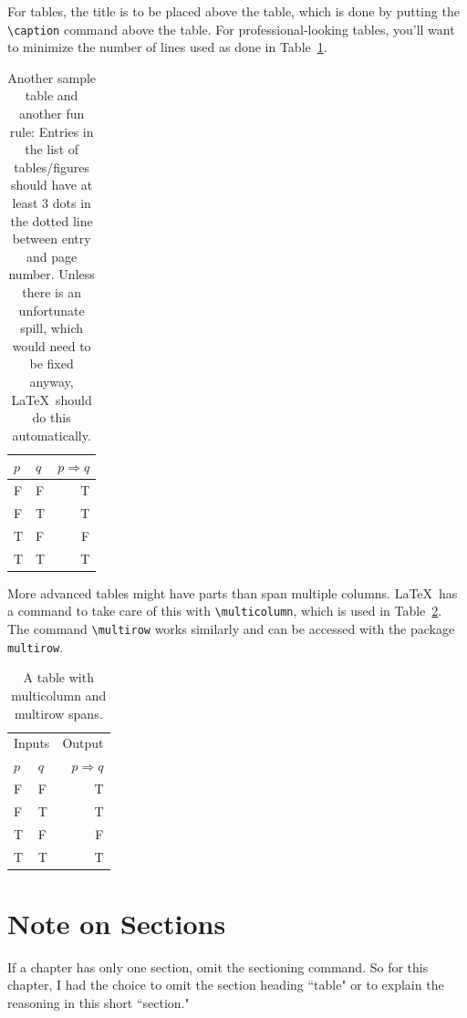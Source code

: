 For tables, the title is to be placed above the table,
which is done by putting the \verb+\caption+ command
above the table.
For professional-looking tables, you'll want to minimize
the number of lines used as done in Table~\ref{tablelabel2}.

\begin{table}[hbt]
	\caption{Another sample table and another fun rule:
	Entries in the list of tables/figures
	should have at least 3 dots in the dotted
	line between entry and page number. Unless there is
	an unfortunate spill, which would need to be fixed anyway,
	\LaTeX \ should do this automatically.
	}
	\label{tablelabel2}
	\centering
	\begin{tabular}{l l  r}
	\toprule
	$p$ & $q$ & $p\Rightarrow q$ \\
	\midrule
	F   & F   & T \\
	F   & T  & T \\
	T  & F   & F  \\
	T  & T  & T  \\
	\bottomrule
	\end{tabular}
\end{table}

More advanced tables might have parts than span multiple
columns. \LaTeX\ has a command to take care of this
with \verb+\multicolumn+, which is used in Table~\ref{multi}.
The command \verb+\multirow+ works similarly and can be accessed
with the package \verb+multirow+.

\begin{table}[hbt]
	\caption{A table with multicolumn and multirow spans.
	}
	\label{multi}
	\centering
	\begin{tabular}{l l  r}
	\toprule
	\multicolumn{2}{c}{Inputs} & \multicolumn{1}{c}{Output}\\
	$p$ & $q$ & $p\Rightarrow q$ \\
	\midrule
	F   & F   & T \\
	F   & T  & T \\
	T  & F   & F  \\
	T  & T  & T  \\
	\bottomrule
	\end{tabular}
\end{table}

\section{Note on Sections}

If a chapter has only one section, omit the sectioning command.
So for this chapter, I had the choice to omit the section heading
``table" or to explain the reasoning in this short ``section."
